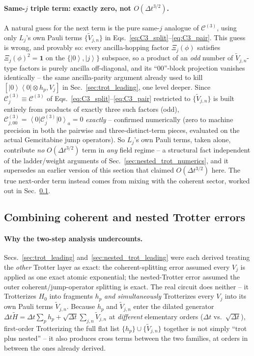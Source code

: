 \documentclass[11pt]{article}
\newcommand{\Dt}{\Delta t}
\newcommand{\calC}{\mathcal{C}}
\newcommand{\Ht}{\tilde{H}}
\renewcommand{\ket}[1]{\left| #1 \right\rangle}
\renewcommand{\bra}[1]{\left\langle #1 \right|}
\begin{document}
\paragraph{Same-\texorpdfstring{$j$}{j} triple term: exactly zero, not \texorpdfstring{$O(\Dt^{3/2})$}{O(Dt\^{}3/2)}.} A natural guess for the next term is the pure same-$j$ analogue of $\calC^{(3)}$, using only $L_j$'s own Pauli terms $\{\tilde{V}_{j,n}\}$ in Eqs.~\eqref{eq:C3_split}--\eqref{eq:C3_pair}. This guess is wrong, and provably so: every ancilla-hopping factor $\Xi_j(\phi)$ satisfies $\Xi_j(\phi)^2=\mathbf1$ on the $\{\ket0,\ket j\}$ subspace, so a product of an \emph{odd} number of $\tilde{V}_{j,n}$-type factors is purely ancilla off-diagonal, and its ``00''-block projection vanishes identically -- the same ancilla-parity argument already used to kill $[\ket0\bra0\otimes h_p,V_j]$ in Sec.~\ref{sec:trot_leading}, one level deeper. Since $\calC_j^{(3)}\equiv\calC^{(3)}$ of Eqs.~\eqref{eq:C3_split}--\eqref{eq:C3_pair} restricted to $\{\tilde{V}_{j,n}\}$ is built entirely from products of exactly three such factors (odd), $\calC^{(3)}_{j,00}=\bra0\calC_j^{(3)}\ket0_a=0$ \emph{exactly} -- confirmed numerically (zero to machine precision in both the pairwise and three-distinct-term pieces, evaluated on the actual Gemcitabine jump operators). So $L_j$'s own Pauli terms, taken alone, contribute \emph{no} $O(\Dt^{3/2})$ term in \emph{any} field regime -- a structural fact independent of the ladder/weight arguments of Sec.~\ref{sec:nested_trot_numerics}, and it supersedes an earlier version of this section that claimed $O(\Dt^{3/2})$ here. The true next-order term instead comes from mixing with the coherent sector, worked out in Sec.~\ref{sec:combined_trot_nested}.

\subsection{Combining coherent and nested Trotter errors}
\label{sec:combined_trot_nested}

\paragraph{Why the two-step analysis undercounts.} Secs.~\ref{sec:trot_leading} and~\ref{sec:nested_trot_leading} were each derived treating the \emph{other} Trotter layer as exact: the coherent-splitting error assumed every $V_j$ is applied as one exact atomic exponential; the nested-Trotter error assumed the outer coherent/jump-operator splitting is exact. The real circuit does neither -- it Trotterizes $H_0$ into fragments $h_p$ \emph{and simultaneously} Trotterizes every $V_j$ into its own Pauli terms $\tilde{V}_{j,n}$. Because $h_p$ and $\tilde{V}_{j,n}$ enter the dilated generator $\Dt\Ht=\Dt\sum_ph_p+\sqrt{\Dt}\sum_{j,n}\tilde{V}_{j,n}$ at \emph{different} elementary orders ($\Dt$ vs.\ $\sqrt{\Dt}$), first-order Trotterizing the full flat list $\{h_p\}\cup\{\tilde{V}_{j,n}\}$ together is not simply ``trot plus nested'' -- it also produces cross terms between the two families, at orders in between the ones already derived.
\end{document}
